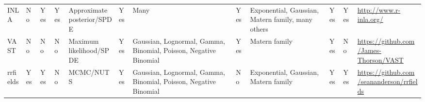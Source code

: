 \documentclass[12pt,english]{article}
\begin{document}
\begin{landscape}
\begin{table}
\begin{minipage}{\textwidth}
\begin{scriptsize}
\begin{tabular}{llllL{2cm}lL{2.4cm}lL{2.0cm}llL{2.0cm}}
        INLA     & No             & Yes     & Yes     & Approximate posterior/SPDE  & Yes        & Many                                                              & Yes      & Exponential, Gaussian, Matern family, many others & Yes                   & Yes       & \url{http://www.r-inla.org/}                                     \\
        VAST     & No             & No      & No      & Maximum likelihood/SPDE     & Yes        & Gaussian, Lognormal, Gamma, Binomial, Poisson, Negative Binomial  & Yes      & Matern family                                     & Yes                   & No        & \url{https://github.com/James-Thorson/VAST}                      \\
        rrfields & Yes            & Yes     & No      & MCMC/NUTS                   & Yes        & Gaussian, Lognormal, Gamma, Binomial, Poisson, Negative Binomial  & No       & Exponential, Gaussian, Matern family              & Yes                   & Yes       & \url{https://github.com/seananderson/rrfields}                  \\
        \bottomrule
      \end{tabular}
    \end{scriptsize}
  \end{minipage}
  \end{table}
\end{landscape}
\end{document}
